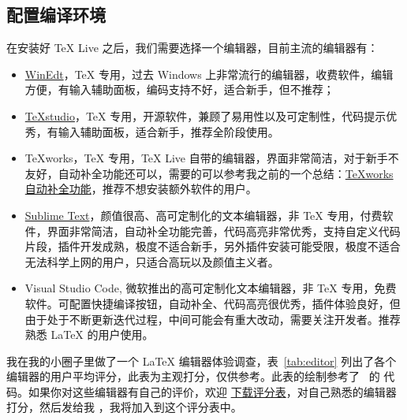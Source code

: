 \documentclass[11pt,a4paper]{dlove}
\begin{document}
\subsection{配置编译环境}
在安装好 \TeX{} Live 之后，我们需要选择一个编辑器，目前主流的编辑器有：
\begin{itemize}
  \item \href{http://www.winedt.com/}{WinEdt}，\TeX{} 专用，过去 Windows 上非常流行的编辑器，收费软件，编辑方便，有输入辅助面板，编码支持不好，适合新手，但不推荐；
  \item \href{http://texstudio.sourceforge.net/}{\TeX{}studio}，\TeX{} 专用，开源软件，兼顾了易用性以及可定制性，代码提示优秀，有输入辅助面板，适合新手，推荐全阶段使用。
  \item \TeX{}works，\TeX{} 专用，\TeX{} Live 自带的编辑器，界面非常简洁，对于新手不友好，自动补全功能还可以，需要的可以参考我之前的一个总结：\href{https://github.com/EthanDeng/texworks-autocomplete}{\TeX{}works 自动补全功能}，推荐不想安装额外软件的用户。
  \item \href{http://www.sublimetext.com/}{Sublime Text}，颜值很高、高可定制化的文本编辑器，非 \TeX{} 专用，付费软件，界面非常简洁，自动补全功能完善，代码高亮非常优秀，支持自定义代码片段，插件开发成熟，极度不适合新手，另外插件安装可能受限，极度不适合无法科学上网的用户，只适合高玩以及颜值主义者。
  \item Visual Studio Code, 微软推出的高可定制化文本编辑器，非 \TeX{} 专用，免费软件。可配置快捷编译按钮，自动补全、代码高亮很优秀，插件体验良好，但由于处于不断更新迭代过程，中间可能会有重大改动，需要关注开发者。推荐熟悉 \LaTeX{} 的用户使用。
\end{itemize}

我在我的小圈子里做了一个 \LaTeX{} 编辑器体验调查，表~\ref{tab:editor} 列出了各个编辑器的用户平均评分，此表为主观打分，仅供参考。此表的绘制参考了~\cite{jake2019} 的 \TikZ{} 代码。如果你对这些编辑器有自己的评价，欢迎 \href{https://github.com/EthanDeng/mhlatex4econ/blob/master/archive/LaTeX 编辑器对比评分表.xlsx}{下载评分表}，对自己熟悉的编辑器打分，然后发给我 ，我将加入到这个评分表中。
\end{document}
